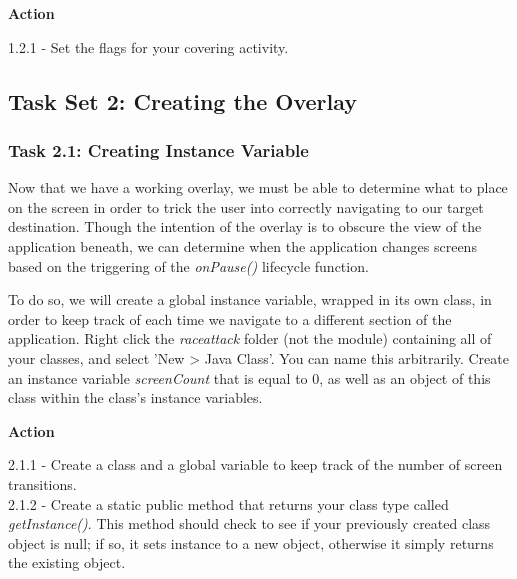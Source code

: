 \documentclass[letterpaper,12pt]{report}
\begin{document}
\bigskip
\begin{mdframed}[backgroundcolor=blue!10,style=code,nobreak=true,align=center,userdefinedwidth=14cm]
\textbf{Action}
\bigskip

1.2.1 - Set the flags for your covering activity.
\end{mdframed}


\subsection*{Task Set 2: Creating the Overlay}\label{sec:Task Set 2: Creating the Overlay}

\subsubsection*{Task 2.1: Creating Instance Variable}\label{sec:Task-2.1-Creating-Instance-Variable}

Now that we have a working overlay, we must be able to determine what to place on the screen in order to trick the user into correctly navigating to our target destination. Though the intention of the overlay is to obscure the view of the application beneath, we can determine when the application changes screens based on the triggering of the \textit{onPause()} lifecycle function.

To do so, we will create a global instance variable, wrapped in its own class, in order to keep track of each time we navigate to a different section of the application. Right click the \emph{raceattack} folder (not the module) containing all of your classes, and select 'New > Java Class'. You can name this arbitrarily. Create an instance variable \emph{screenCount} that is equal to 0, as well as an object of this class within the class's instance variables.

\bigskip
\begin{mdframed}[backgroundcolor=blue!10,style=code,nobreak=true,align=center,userdefinedwidth=14cm]
\textbf{Action}
\bigskip

2.1.1 - Create a class and a global variable to keep track of the number of screen transitions.\\
2.1.2 - Create a static public method that returns your class type called \\\emph{getInstance()}. This method should check to see if your previously created class object is null; if so, it sets instance to a new object, otherwise it simply returns the existing object.
\end{mdframed}
\end{document}
